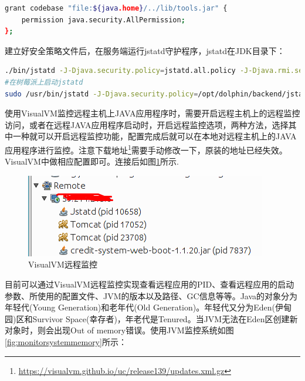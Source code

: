 \documentclass[12pt]{book}
\numberwithin{dummy}{section}
\theoremstyle{ocrenumbox}
\theoremstyle{blacknumex}
\theoremstyle{blacknumbox}
\theoremstyle{ocrenum}
\begin{document}
\begin{lstlisting}[language=Bash]
grant codebase "file:${java.home}/../lib/tools.jar" {  
	permission java.security.AllPermission;  
}; 
\end{lstlisting}


建立好安全策略文件后，在服务端运行jstatd守护程序，jstatd在JDK目录下：

\begin{lstlisting}[language=Bash]
./bin/jstatd -J-Djava.security.policy=jstatd.all.policy -J-Djava.rmi.server.hostname=10.10.1.12 -J-Djava.rmi.server.logCalls=true -p 1011
#在树莓派上启动jstatd
sudo /usr/bin/jstatd -J-Djava.security.policy=/opt/dolphin/backend/jstatd.all.policy -J-Djava.rmi.server.hostname=192.168.31.25 -J-Djava.rmi.server.logCalls=true -p 1011
\end{lstlisting}

使用VisualVM监控远程主机上JAVA应用程序时，需要开启远程主机上的远程监控访问，或者在远程JAVA应用程序启动时，开启远程监控选项，两种方法，选择其中一种就可以开启远程监控功能，配置完成后就可以在本地对远程主机上的JAVA应用程序进行监控。注意下载地址\footnote{\url{https://visualvm.github.io/uc/release139/updates.xml.gz}}需要手动修改一下，原装的地址已经失效。VisualVM中做相应配置即可。连接后如图\ref{fig:visualvmconnectremote}所示.

\begin{figure}[htbp]
	\centering
	\includegraphics[scale=0.7]{visualvmconnectremote.png}
	\caption{VisualVM远程监控}
	\label{fig:visualvmconnectremote}
\end{figure}

目前可以通过VisualVM远程监控实现查看远程应用的PID、查看远程应用的启动参数、所使用的配置文件、JVM的版本以及路径、GC信息等等。Java的对象分为年轻代(Young Generation)和老年代(Old Generation)。年轻代又分为Eden(伊甸园)区和Survivor Space(幸存者)，年老代是Tenured。当JVM无法在Eden区创建新对象时，则会出现Out of memory错误。使用JVM监控系统如图\ref{fig:monitorsystemmemory}所示：
\end{document}
